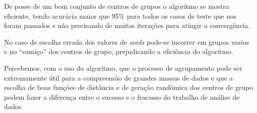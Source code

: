 \documentclass[12pt, a4paper]{article}
\begin{document}
De posse de um bom conjunto de centros de grupos o algoritmo se mostra eficiente, tendo acurácia maior que 95\% para todos os casos de teste que nos foram passados e não precisando de muitas iterações para atingir a convergência.

No caso de escolha errada dos valores de \textit{seeds} pode-se incorrer em grupos vazios e no ``sumiço'' dos centros de grupo, prejudicando a eficiência do algoritmo.

Percebemos, com o uso do algoritmo, que o processo de agrupamento pode ser extremamente útil para a compreensão de grandes massas de dados e que a escolha de boas funções de distância e de geração randômica dos centros de grupo podem fazer a diferença entre o sucesso e o fracasso do trabalho de análise de dados.

\newpage

\end{document}
